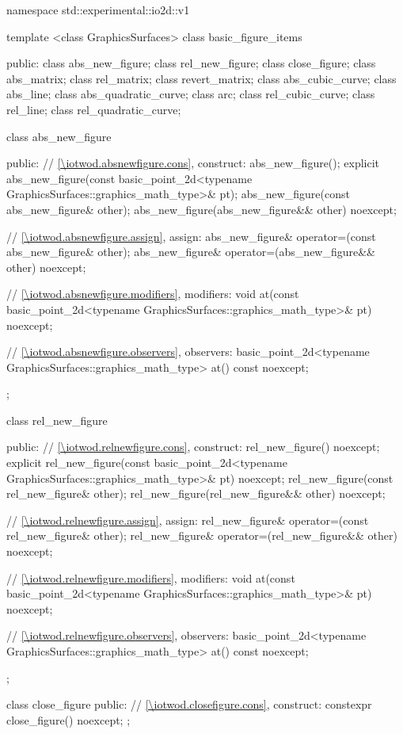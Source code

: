 \begin{codeblock}
namespace std::experimental::io2d::v1 {
  template <class GraphicsSurfaces>
  class basic_figure_items {
  public:
    class abs_new_figure;
    class rel_new_figure;
    class close_figure;
    class abs_matrix;
    class rel_matrix;
    class revert_matrix;
    class abs_cubic_curve;
    class abs_line;
    class abs_quadratic_curve;
    class arc;
    class rel_cubic_curve;
    class rel_line;
    class rel_quadratic_curve;

    class abs_new_figure {
    public:
      // \ref{\iotwod.absnewfigure.cons}, construct:
      abs_new_figure();
      explicit abs_new_figure(const basic_point_2d<typename
      GraphicsSurfaces::graphics_math_type>& pt);
      abs_new_figure(const abs_new_figure& other);
      abs_new_figure(abs_new_figure&& other) noexcept;

      // \ref{\iotwod.absnewfigure.assign}, assign:
      abs_new_figure& operator=(const abs_new_figure& other);
      abs_new_figure& operator=(abs_new_figure&& other) noexcept;

      // \ref{\iotwod.absnewfigure.modifiers}, modifiers:
      void at(const basic_point_2d<typename GraphicsSurfaces::graphics_math_type>& pt) noexcept;

      // \ref{\iotwod.absnewfigure.observers}, observers:
      basic_point_2d<typename GraphicsSurfaces::graphics_math_type> at() const noexcept;
    };

    class rel_new_figure {
    public:
      // \ref{\iotwod.relnewfigure.cons}, construct:
      rel_new_figure() noexcept;
      explicit rel_new_figure(const basic_point_2d<typename
        GraphicsSurfaces::graphics_math_type>& pt) noexcept;
      rel_new_figure(const rel_new_figure& other);
      rel_new_figure(rel_new_figure&& other) noexcept;

      // \ref{\iotwod.relnewfigure.assign}, assign:
      rel_new_figure& operator=(const rel_new_figure& other);
      rel_new_figure& operator=(rel_new_figure&& other) noexcept;

      // \ref{\iotwod.relnewfigure.modifiers}, modifiers:
      void at(const basic_point_2d<typename GraphicsSurfaces::graphics_math_type>& pt) noexcept;

      // \ref{\iotwod.relnewfigure.observers}, observers:
      basic_point_2d<typename GraphicsSurfaces::graphics_math_type> at() const noexcept;
    };

    class close_figure {
    public:
      // \ref{\iotwod.closefigure.cons}, construct:
      constexpr close_figure() noexcept;
    };

}}
\end{codeblock}
